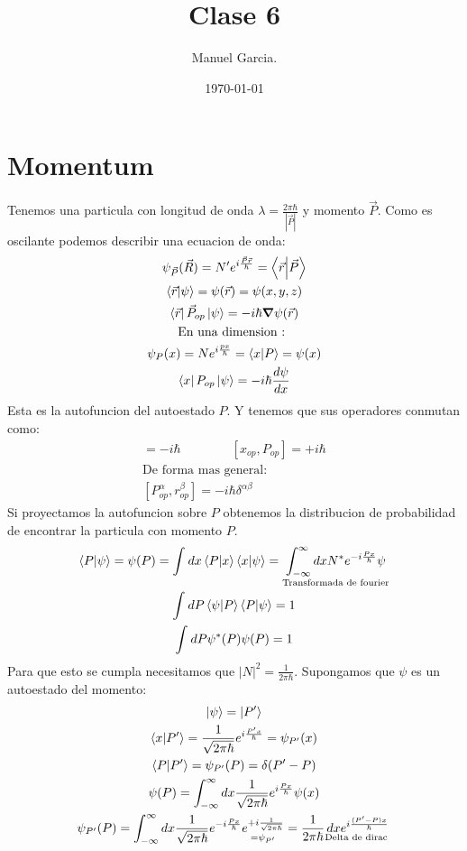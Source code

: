 \documentclass{article}
\title{Clase 6}
\author{Manuel Garcia.}
\date{\today}
\begin{document}
\maketitle

\section{Momentum }
Tenemos una particula con longitud de onda $ \lambda = \frac{2\pi \hbar }{|\vec P |} $ y momento $ \vec P  $. Como es oscilante podemos describir una ecuacion de onda: 
\begin{gather}
  \psi _{\vec P } (\vec R) = N' e ^ {i \frac{\vec P \vec r }{\hbar }} = \bra{\vec r }\ket{\vec P }\\
  \bra{\vec r }\ket{\psi} = \psi (\vec r )  = \psi (x,y,z)\\
  \bra{\vec r }\vec P _{op } \ket{\psi} = -i \hbar \grad \psi (\vec r)\\ 
  \text{En una dimension : }\\
  \psi _{P } (x) =  N e ^ {i \frac{px }{\hbar }}= \bra{x }\ket{P }= \psi (x) \\
  \bra{x }P _{op } \ket{\psi } = - i \hbar \frac{d \psi  }{d x }
\end{gather}
Esta es la autofuncion del autoestado $ P $.
Y tenemos que sus operadores conmutan como: 
\begin{gather}
  [P _{op } , x _{op } ] = -i \hbar \qquad \qquad [x _{op } , P _{op } ] = + i \hbar \\
  \text{De forma mas general: }\\
  [P _{op } ^ {\alpha}, r _{op } ^ {\beta}] = -i \hbar \delta ^ {\alpha \beta}
\end{gather}
Si proyectamos la autofuncion sobre $ P  $ obtenemos la distribucion de probabilidad de encontrar la particula con momento $ P  $. 
\begin{gather}
  \bra{P }\ket{\psi }=\psi(P) = \int_{}^{}dx \bra{P }\ket{x}\bra{x}\ket{\psi}  = \underset{\text{Transformada de fourier}}{\int_{-\infty}^{\infty}dx N ^ {* } e ^ {-i \frac{Px }{\hbar }}\psi}\\
  \int_{}^{}dP \bra{\psi}\ket{P }\bra{P }\ket{\psi} = 1 \\
  \int_{}^{}dP \psi ^ {* }(P)\psi(P) = 1
\end{gather}
Para que esto se cumpla necesitamos que $ \left|N \right|^ {2 } = \frac{1}{2\pi \hbar } $. 
Supongamos que $ \psi  $ es un autoestado del momento: 
\begin{gather}
  \ket{\psi} = \ket{P' }\\
  \bra{x }\ket{P'} = \frac{1}{\sqrt{2 \pi \hbar } }e ^ {i \frac{P' x }{\hbar }} = \psi _{P' } (x)\\
  \bra{P }\ket{P' } = \psi _{P' } (P) = \delta (P'-P)\\
  \psi (P) = \int_{-\infty}^{\infty}dx \frac{1}{\sqrt{2\pi \hbar } }e ^ {i \frac{Px }{\hbar }}\psi(x)\\
  \psi _{P' } (P) = \int_{-\infty}^{\infty} dx \frac{1}{\sqrt{2\pi \hbar } } e ^ {- i \frac{Px }{\hbar }} \underset{=\psi _{P'} }{e ^ {+i \frac{1}{\sqrt{2 \pi \hbar } }}} = \frac{1}{2 \pi \hbar } \underset{\text{Delta de dirac }}{dx e ^ {i \frac{(P'-P) x }{\hbar }}}
\end{gather} 
\end{document}
